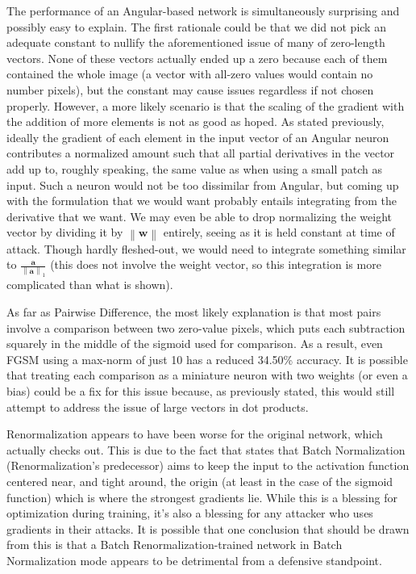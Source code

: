 The performance of an Angular-based network is simultaneously surprising and possibly easy to
explain. The first rationale could be that we did not pick an adequate constant to nullify the
aforementioned issue of many of zero-length vectors. None of these vectors actually ended up a zero
because each of them contained the whole image (a vector with all-zero values would contain no
number pixels), but the constant may cause issues regardless if not chosen properly. However, a more
likely scenario is that the scaling of the gradient with the addition of more elements is not as
good as hoped. As stated previously, ideally the gradient of each element in the input vector of an
Angular neuron contributes a normalized amount such that all partial derivatives in the vector add
up to, roughly speaking, the same value as when using a small patch as input. Such a neuron would
not be too dissimilar from Angular, but coming up with the formulation that we would want probably
entails integrating from the derivative that we want. We may even be able to drop normalizing the
weight vector by dividing it by $\left\| \mathbf{w} \right\|$ entirely, seeing as it is held
constant at time of attack. Though hardly fleshed-out, we would need to integrate something similar
to $\frac{\mathbf{a}}{\left\| \mathbf{a} \right\|_1}$ (this does not involve the weight vector, so
this integration is more complicated than what is shown).

As far as Pairwise Difference, the most likely explanation is that most pairs involve a comparison
between two zero-value pixels, which puts each subtraction squarely in the middle of the sigmoid
used for comparison. As a result, even FGSM using a max-norm of just 10 has a reduced 34.50\%
accuracy. It is possible that treating each comparison as a miniature neuron with two weights (or
even a bias) could be a fix for this issue because, as previously stated, this would still attempt
to address the issue of large vectors in dot products.

Renormalization appears to have been worse for the original network, which actually checks out. This
is due to the fact that \cite{ioffe2015batch} states that Batch Normalization~\cite{ioffe2015batch}
(Renormalization's predecessor) aims to keep the input to the activation function centered near, and
tight around, the origin (at least in the case of the sigmoid function) which is where the strongest
gradients lie. While this is a blessing for optimization during training, it's also a blessing for
any attacker who uses gradients in their attacks. It is possible that one conclusion that should be
drawn from this is that a Batch Renormalization-trained network in Batch Normalization mode appears
to be detrimental from a defensive standpoint.

